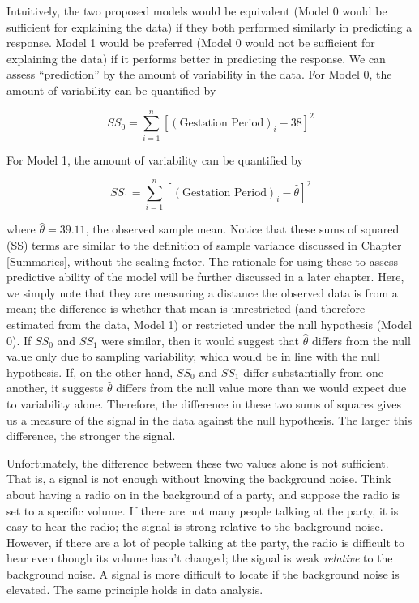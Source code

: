 \documentclass[
]{book}
\theoremstyle{plain}
\theoremstyle{mydefn}
\theoremstyle{myexmpl}
\theoremstyle{remark}
\begin{document}
Intuitively, the two proposed models would be equivalent (Model 0 would be sufficient for explaining the data) if they both performed similarly in predicting a response. Model 1 would be preferred (Model 0 would not be sufficient for explaining the data) if it performs better in predicting the response. We can assess ``prediction'' by the amount of variability in the data. For Model 0, the amount of variability can be quantified by

\[SS_0 = \sum_{i=1}^{n} \left[(\text{Gestation Period})_i - 38\right]^2\]

For Model 1, the amount of variability can be quantified by

\[SS_1 = \sum_{i=1}^{n} \left[(\text{Gestation Period})_i - \widehat{\theta}\right]^2\]

where \(\widehat{\theta} = 39.11\), the observed sample mean. Notice that these sums of squared (SS) terms are similar to the definition of sample variance discussed in Chapter \ref{Summaries}, without the scaling factor. The rationale for using these to assess predictive ability of the model will be further discussed in a later chapter. Here, we simply note that they are measuring a distance the observed data is from a mean; the difference is whether that mean is unrestricted (and therefore estimated from the data, Model 1) or restricted under the null hypothesis (Model 0). If \(SS_0\) and \(SS_1\) were similar, then it would suggest that \(\widehat{\theta}\) differs from the null value only due to sampling variability, which would be in line with the null hypothesis. If, on the other hand, \(SS_0\) and \(SS_1\) differ substantially from one another, it suggests \(\widehat{\theta}\) differs from the null value more than we would expect due to variability alone. Therefore, the difference in these two sums of squares gives us a measure of the signal in the data against the null hypothesis. The larger this difference, the stronger the signal.

Unfortunately, the difference between these two values alone is not sufficient. That is, a signal is not enough without knowing the background noise. Think about having a radio on in the background of a party, and suppose the radio is set to a specific volume. If there are not many people talking at the party, it is easy to hear the radio; the signal is strong relative to the background noise. However, if there are a lot of people talking at the party, the radio is difficult to hear even though its volume hasn't changed; the signal is weak \emph{relative} to the background noise. A signal is more difficult to locate if the background noise is elevated. The same principle holds in data analysis.
\end{document}
